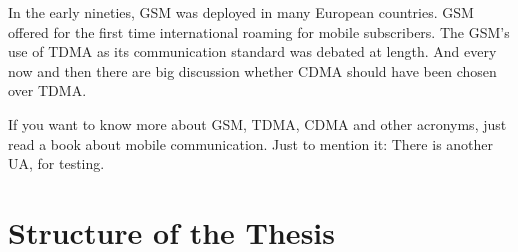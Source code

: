 In the early nineties, \acs{GSM} was deployed in many European countries. \ac{GSM} offered for the first time international roaming for mobile subscribers. The \acs{GSM}’s use of \ac{TDMA} as its communication standard was debated at length. And every now and then there are big discussion whether \ac{CDMA} should have been chosen over \ac{TDMA}.

If you want to know more about \acf{GSM}, \acf{TDMA}, \acf{CDMA} and other acronyms, just read a book about mobile communication. Just to mention it: There is another \ac{UA}, for testing.

\section{Structure of the Thesis}

